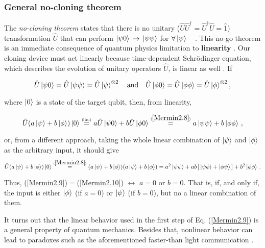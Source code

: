 \documentclass[11pt]{article}
\numberwithin{equation}{section} %
\numberwithin{figure}{section} %
\newcommand\numeq[1] %
  {\stackrel{\scriptscriptstyle(\mkern-1.5mu#1\mkern-1.5mu)}{=}}
\begin{document}
\begin{appendices}
\subsubsection{General no-cloning theorem}

The \emph{no-cloning theorem} states that there is no unitary ($\hat{U}\hat{U}^\dagger=\hat{U}^\dagger\hat{U}=\hat{1}$) transformation $\hat{U}$ that can perform $\ket{\psi 0}\,\rightarrow\,\ket{\psi\psi}$ for $\forall\ket{\psi}$  $\,\,\,$ \cite[p.~39, l.~28-31]{Mermin}. This no-go theorem is an immediate consequence of quantum physics limitation to \textbf{linearity} \cite[p.~1, l.~33]{QAL_IBM}. Our cloning device must act linearly because time-dependent Schrödinger equation, which describes the evolution of unitary operators $\hat{U}$, is linear as well \cite[p.~429, footnote~12]{Nielsen}. If  $\,\,\,$  $\,\,\,$ \cite[p.~39, Eq.~(2.8)]{Mermin}

\begin{equation} \label{Mermin2.8}
\hat{U}\ket{\psi 0}=\hat{U}\ket{\psi\psi}=\hat{U}\ket{\psi}^{\otimes 2}
\quad\mathrm{and}\quad
\hat{U}\ket{\phi 0}=\hat{U}\ket{\phi \phi}=\hat{U}\ket{\phi}^{\otimes 2}\textrm{,}
\end{equation}

where $\ket{0}$ is a state of the target qubit, then, from linearity,

\begin{equation} \label{Mermin2.9}
\hat{U}(a\ket{\psi}+b\ket{\phi})\ket{0}\numeq{\textrm{lin.}}a\hat{U}\ket{\psi 0}+b\hat{U}\ket{\phi 0}\numeq{\ref{Mermin2.8}}a\ket{\psi\psi}+b\ket{\phi\phi}\,\textrm{,}
\end{equation}    

or, from a different approach, taking the whole linear combination of $\ket{\psi}$ and $\ket{\phi}$ as the arbitrary input, it should give $\,\,\,$ \cite[p.~429, Eq.~(12.17)]{Griffiths}
\begin{equation} \label{Mermin2.10}
\hat{U}(a\ket{\psi}+b\ket{\phi})\ket{0}\numeq{\ref{Mermin2.8}}(a\ket{\psi}+b\ket{\phi})(a\ket{\psi}+b\ket{\phi})=a^2\ket{\psi\psi}+ab\,[\,\ket{\psi\phi}+\ket{\phi\psi}\,]+b^2\ket{\phi\phi}\,\textrm{.}
\end{equation}

Thus, (\ref{Mermin2.9})$=$(\ref{Mermin2.10}) $\leftrightarrow$ $a=0$ or $b=0$. That is, if, and only if, the input is either $\ket{\phi}$ (if $a=0$) or $\ket{\psi}$ (if $b=0$), but no a linear combination of them.

It turns out that the linear behavior used in the first step of Eq. (\ref{Mermin2.9}) is a general property of quantum mechanics. Besides that, nonlinear behavior can lead to paradoxes such as the aforementioned faster-than light communication \cite[p.~18, l.~7-10]{Nielsen}.


\end{appendices}
\end{document}

